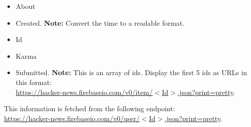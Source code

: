 \documentclass{article}
\begin{document}
\begin{itemize}
\begin{itemize}
	\begin{itemize}
		\item About
		\item Created. \textbf{Note:} Convert the time to a readable format.
		\item Id
		\item Karma
		\item Submitted. \textbf{Note:} This is an array of ids. Display the first 5 ids as URLs in this format:\\
		 \href{https://hacker-news.firebaseio.com/v0/item/$<$Id$>$.json?print=pretty}{https://hacker-news.firebaseio.com/v0/item/$<$Id$>$.json?print=pretty}.
	\end{itemize}
	This information is fetched from the following endpoint:\\
	\href{https://hacker-news.firebaseio.com/v0/user/$<$Id$>$.json?print=pretty}{https://hacker-news.firebaseio.com/v0/user/$<$Id$>$.json?print=pretty}.
	\end{itemize}
\end{itemize}
\end{document}
